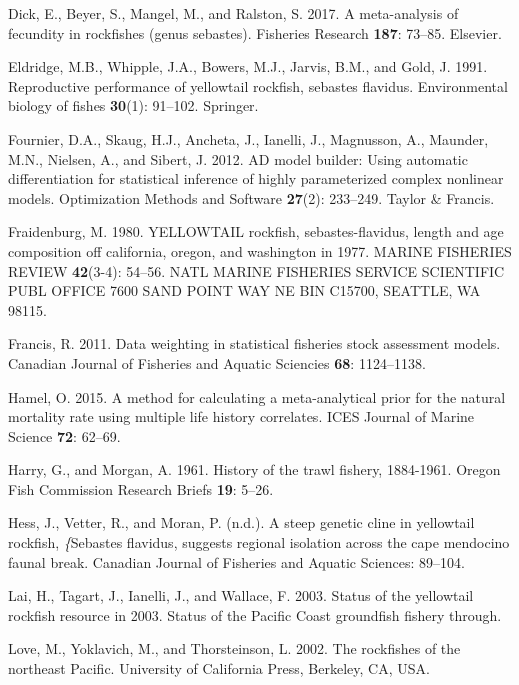 \documentclass[12pt,]{article}
\begin{document}
\hypertarget{ref-Dick2017}{}
Dick, E., Beyer, S., Mangel, M., and Ralston, S. 2017. A meta-analysis
of fecundity in rockfishes (genus sebastes). Fisheries Research
\textbf{187}: 73--85. Elsevier.

\hypertarget{ref-Eldridge1991}{}
Eldridge, M.B., Whipple, J.A., Bowers, M.J., Jarvis, B.M., and Gold, J.
1991. Reproductive performance of yellowtail rockfish, sebastes
flavidus. Environmental biology of fishes \textbf{30}(1): 91--102.
Springer.

\hypertarget{ref-Fournier2012}{}
Fournier, D.A., Skaug, H.J., Ancheta, J., Ianelli, J., Magnusson, A.,
Maunder, M.N., Nielsen, A., and Sibert, J. 2012. AD model builder: Using
automatic differentiation for statistical inference of highly
parameterized complex nonlinear models. Optimization Methods and
Software \textbf{27}(2): 233--249. Taylor \& Francis.

\hypertarget{ref-Fraidenburg1980}{}
Fraidenburg, M. 1980. YELLOWTAIL rockfish, sebastes-flavidus, length and
age composition off california, oregon, and washington in 1977. MARINE
FISHERIES REVIEW \textbf{42}(3-4): 54--56. NATL MARINE FISHERIES SERVICE
SCIENTIFIC PUBL OFFICE 7600 SAND POINT WAY NE BIN C15700, SEATTLE, WA
98115.

\hypertarget{ref-Francis2011}{}
Francis, R. 2011. Data weighting in statistical fisheries stock
assessment models. Canadian Journal of Fisheries and Aquatic Sciencies
\textbf{68}: 1124--1138.

\hypertarget{ref-Hamel2015}{}
Hamel, O. 2015. A method for calculating a meta-analytical prior for the
natural mortality rate using multiple life history correlates. ICES
Journal of Marine Science \textbf{72}: 62--69.

\hypertarget{ref-Harry1961}{}
Harry, G., and Morgan, A. 1961. History of the trawl fishery, 1884-1961.
Oregon Fish Commission Research Briefs \textbf{19}: 5--26.

\hypertarget{ref-Hess2011}{}
Hess, J., Vetter, R., and Moran, P. (n.d.). A steep genetic cline in
yellowtail rockfish, \emph{\{}Sebastes flavidus, suggests regional
isolation across the cape mendocino faunal break. Canadian Journal of
Fisheries and Aquatic Sciences: 89--104.

\hypertarget{ref-Lai2003}{}
Lai, H., Tagart, J., Ianelli, J., and Wallace, F. 2003. Status of the
yellowtail rockfish resource in 2003. Status of the Pacific Coast
groundfish fishery through.

\hypertarget{ref-Love2002}{}
Love, M., Yoklavich, M., and Thorsteinson, L. 2002. The rockfishes of
the northeast Pacific. University of California Press, Berkeley, CA,
USA.
\end{document}
